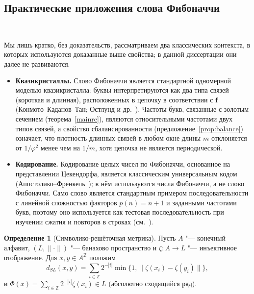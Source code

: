 \documentclass[a4paper,14pt]{extreport}
\theoremstyle{plain}
\theoremstyle{definition}
\newtheorem{definition}{Определение}[section]
\theoremstyle{remark}
\begin{document}
\subsection{Практические приложения слова Фибоначчи}~\label{sec3.7.2}

Мы лишь кратко, без доказательств, рассматриваем два классических контекста, в которых используются доказанные выше свойства; в данной диссертации они далее не развиваются.

\begin{itemize}
	\item \textbf{Квазикристаллы.} Слово Фибоначчи является стандартной одномерной моделью квазикристалла: буквы интерпретируются как два типа связей (короткая и длинная), расположенных в цепочку в соответствии с $\mathbf f$ (Конмото--Каданов--Тан; Остлунд и др.~\cite{KKT,Ostlund}). Частоты букв, связанные с золотым сечением (теорема~\ref{mainre}), являются относительными частотами двух типов связей, а свойство сбалансированности (предложение~\ref{prop:balance}) означает, что плотность длинных связей в любом окне длины $m$ отклоняется от $1/\varphi^{2}$ менее чем на $1/m$, хотя цепочка не является периодической.
	
	\item \textbf{Кодирование.} Кодирование целых чисел по Фибоначчи, основанное на представлении Цекендорфа, является классическим универсальным кодом (Апостолико--Френкель~\cite{ApostolicoFraenkel}); в нём используются числа Фибоначчи, а не слово Фибоначчи. Само слово является стандартным примером последовательности с линейной сложностью факторов $p(n)=n+1$ и заданными частотами букв, поэтому оно используется как тестовая последовательность при изучении сжатия и повторов в строках (см.~\cite{Crochemore}).
\end{itemize}
\begin{definition}[Символико-решёточная метрика]\label{sec:dSL}
	Пусть $A$ "--- конечный алфавит, $(L,\|\cdot\|)$ "--- банахово пространство и $\zeta:A\to L$ "--- инъективное отображение.
	Для $x,y\in A^{\mathbb Z}$ положим \begin{equation}\label{SymboliclatticeMetri} d_{SL}(x,y)=\sum_{i\in\mathbb Z}2^{-|i|}\min\{1,\|\zeta(x_i)-\zeta(y_i)\|\}, \end{equation} и $\Phi(x)=\sum_{i\in\mathbb Z}2^{-|i|}\zeta(x_i)\in L$ (абсолютно сходящийся ряд).
\end{definition}
\end{document}
